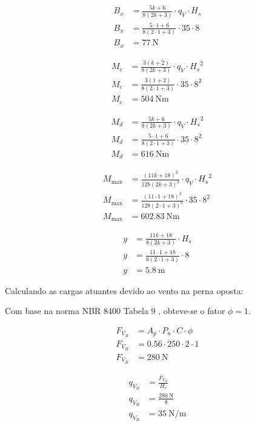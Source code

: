 \begin{align*}
  B_x & = \frac{5 k + 6}{8 \left( 2 k + 3 \right)} \cdot q_V \cdot H_s                \\
  B_x & = \frac{5 \cdot 1 + 6}{8 \left( 2 \cdot 1 + 3 \right)} \cdot \num{35} \cdot 8 \\
  B_x & = \boxed{\SI{77}{\newton}}
\end{align*}

\begin{align*}
  M_c & = \frac{3 \left(k + 2 \right)}{8 \left( 2 k + 3 \right)} \cdot q_V \cdot {H_s}^2          \\
  M_c & = \frac{3 \left(1 + 2 \right)}{8 \left( 2 \cdot 1 + 3 \right)} \cdot \num{35} \cdot {8}^2 \\
  M_c & = \boxed{\SI{504}{\newton\meter}}
\end{align*}

\begin{align*}
  M_d & = \frac{5 k + 6}{8 \left( 2 k + 3 \right)} \cdot q_V \cdot {H_s}^2                \\
  M_d & = \frac{5 \cdot 1 + 6}{8 \left( 2 \cdot 1 + 3 \right)} \cdot \num{35} \cdot {8}^2 \\
  M_d & = \boxed{\SI{616}{\newton\meter}}
\end{align*}

\begin{align*}
  M_{\text{max}} & = \frac{{\left( 11 k + 18 \right)}^2}{128 {\left(2 k + 3 \right)}^2} \cdot q_V \cdot {H_s}^2                \\
  M_{\text{max}} & = \frac{{\left( 11 \cdot 1 + 18 \right)}^2}{128 {\left(2 \cdot 1 + 3 \right)}^2} \cdot \num{35} \cdot {8}^2 \\
  M_{\text{max}} & = \boxed{\SI{602.83}{\newton\meter}}
\end{align*}

\begin{align*}
  y & = \frac{11 k + 18}{8 \left( 2 k + 3 \right)} \cdot H_s           \\
  y & = \frac{11 \cdot 1 + 18}{8 \left( 2 \cdot 1 + 3 \right)} \cdot 8 \\
  y & = \boxed{\SI{5.8}{\meter}}
\end{align*}

Calculando as cargas atuantes devido ao vento na perna oposta:

Com base na norma NBR 8400 Tabela 9 \cite{nbr8400}, obteve-se o fator $\phi = 1$.

\begin{align*}
  F_{V_B} & = A_p \cdot P_a \cdot C \cdot \phi           \\
  F_{V_B} & = \num{0.56} \cdot \num{250} \cdot 2 \cdot 1 \\
  F_{V_B} & = \boxed{\SI{280}{\newton}}
\end{align*}

\begin{align*}
  q_{V_B} & = \frac{F_{V_B}}{H_s}                \\
  q_{V_B} & = \frac{\SI{280}{\newton}}{8}        \\
  q_{V_B} & = \boxed{\SI{35}{\newton\per\meter}}
\end{align*}
